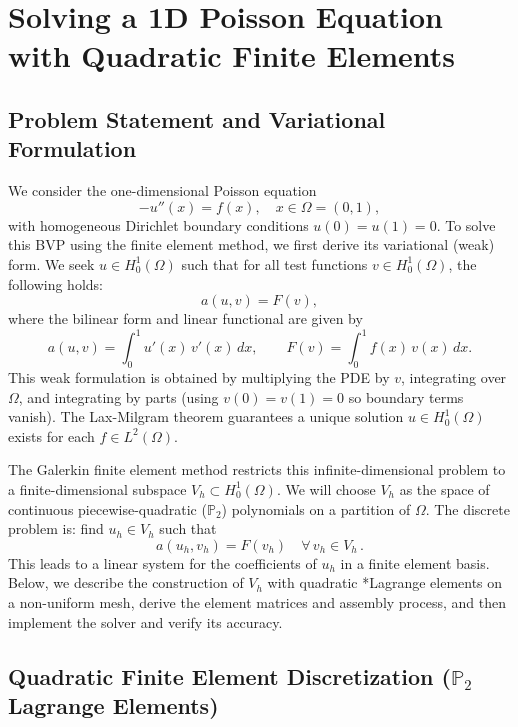 \documentclass[a4paper,10pt]{article}
\begin{document}

\clearpage


\section{Solving a 1D Poisson Equation with Quadratic Finite Elements}

\subsection{Problem Statement and Variational Formulation}

We consider the one-dimensional Poisson equation
\[
	-u''(x) = f(x), \quad x \in \Omega=(0,1),
\]
with homogeneous Dirichlet boundary conditions \(u(0)=u(1)=0\).
To solve this BVP using the finite element method, we first derive its variational (weak) form.
We seek \(u \in H^1_0(\Omega)\) such that for all test functions \(v \in H^1_0(\Omega)\), the following holds:
\[
	a(u,v) = F(v),
\]
where the bilinear form and linear functional are given by
\[
	a(u,v) = \int_0^1 u'(x)\,v'(x)\,dx, \qquad F(v) = \int_0^1 f(x)\,v(x)\,dx.
\]
This weak formulation is obtained by multiplying the PDE by \(v\), integrating over \(\Omega\), and integrating by parts (using \(v(0)=v(1)=0\) so boundary terms vanish). The Lax-Milgram theorem guarantees a unique solution \(u \in H^1_0(\Omega)\) exists for each \(f\in L^2(\Omega)\).

The Galerkin finite element method restricts this infinite-dimensional problem to a finite-dimensional subspace \(V_h \subset H^1_0(\Omega)\). We will choose \(V_h\) as the space of continuous piecewise-quadratic (\(\mathbb{P}_2 \)) polynomials on a partition of \(\Omega\). The discrete problem is: find \(u_h \in V_h\) such that
\[
	a(u_h, v_h) = F(v_h) \quad \forall\, v_h \in V_h\,.\tag{*}
\]
This leads to a linear system for the coefficients of \(u_h\) in a finite element basis. Below, we describe the construction of \(V_h\) with quadratic *Lagrange\* elements on a non-uniform mesh, derive the element matrices and assembly process, and then implement the solver and verify its accuracy.

\subsection{Quadratic Finite Element Discretization (\(\mathbb{P}_2 \) Lagrange Elements)}
\end{document}
